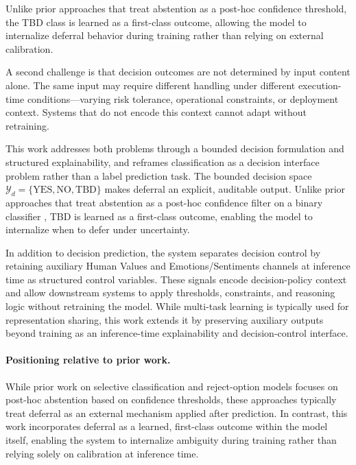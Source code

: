 \documentclass[11pt]{article}
\begin{document}
Unlike prior approaches that treat abstention as a post-hoc confidence threshold, the TBD class is learned as a first-class outcome, allowing the model to internalize deferral behavior during training rather than relying on external calibration.

A second challenge is that decision outcomes are not determined by input content
alone. The same input may require different handling under different
execution-time conditions—varying risk tolerance, operational constraints, or
deployment context. Systems that do not encode this context cannot adapt without
retraining.

This work addresses both problems through a bounded decision formulation and
structured explainability, and reframes classification as a decision interface
problem rather than a label prediction task. The bounded decision space
$\mathcal{Y}_d = \{\text{YES}, \text{NO}, \text{TBD}\}$ makes deferral an
explicit, auditable output. Unlike prior approaches that treat abstention as a
post-hoc confidence filter on a binary classifier
\cite{elyaniv2010selective, geifman2017selective, franc2023reject}, TBD is
learned as a first-class outcome, enabling the model to internalize when to
defer under uncertainty.

In addition to decision prediction, the system separates decision control by
retaining auxiliary Human Values and Emotions/Sentiments channels at inference
time as structured control variables. These signals encode decision-policy
context and allow downstream systems to apply thresholds, constraints, and
reasoning logic without retraining the model. While multi-task learning
\cite{caruana1997multitask} is typically used for representation sharing, this
work extends it by preserving auxiliary outputs beyond training as an
inference-time explainability and decision-control interface.

\paragraph{Positioning relative to prior work.}
While prior work on selective classification and reject-option models focuses on post-hoc abstention
based on confidence thresholds, these approaches typically treat deferral as an external mechanism
applied after prediction. In contrast, this work incorporates deferral as a learned, first-class
outcome within the model itself, enabling the system to internalize ambiguity during training rather
than relying solely on calibration at inference time.
\end{document}
